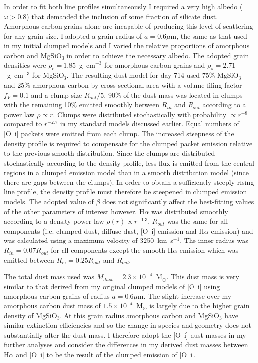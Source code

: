 In order to fit both line profiles simultaneously I required a very high albedo ($\omega > 0.8$) that demanded the inclusion of some fraction of silicate dust. Amorphous carbon grains alone are incapable of producing this level of scattering for any grain size.  I adopted a grain radius of $a=0.6\mu$m, the same as that used in my initial clumped models and I varied the relative proportions of amorphous carbon and MgSiO$_3$ in order to achieve the necessary albedo.  The adopted grain densities were $\rho_c=1.85$~g~cm$^{-3}$ for amorphous carbon grains and $\rho_s = 2.71$~g~cm$^{-3}$ for MgSiO$_3$.  The resulting dust model for day 714 used 75\% MgSiO$_3$ and 25\% amorphous carbon by cross-sectional area with a volume filing factor $f_V=0.1$ and a clump size $R_{out}/5$.  90\% of the dust mass was located in clumps with the remaining 10\% emitted smoothly between $R_{in}$ and $R_{out}$ according to a power law $\rho \propto r$. Clumps were distributed stochastically with probability $\propto r^{-8}$ compared to $r^{-2.7}$ in my standard models discussed earlier. Equal numbers of [O~{\sc i}] packets were emitted from each clump. The increased steepness of the density profile is required to compensate for the clumped packet emission relative to the previous smooth distribution.  Since the clumps are distributed stochastically according to the density profile, less flux is emitted from the central regions in a clumped emission model than in a smooth distribution model (since there are gaps between the clumps).  In order to obtain a sufficiently steeply rising line profile, the density profile must therefore be steepened in clumped emission models. The adopted value of $\beta$ does not significantly affect the best-fitting values of the other parameters of interest however.  H$\alpha$ was distributed smoothly according to a density power law $\rho(r) \propto r^{-1.3}$.  $R_{out}$ was the same for all components (i.e. clumped dust, diffuse dust, [O~{\sc i}] emission and H$\alpha$ emission) and was calculated using a maximum velocity of 3250~km~s$^{-1}$.  The inner radius was $R_{in} = 0.07 R_{out}$ for all components except the smooth H$\alpha$ emission which was emitted between $R_{in}=0.25R_{out}$ and $R_{out}$.  

The total dust mass used was $M_{dust}=2.3 \times 10^{-4}$~M$_{\odot}$.  This dust mass is very similar to that derived from my original clumped models of [O~{\sc i}] using amorphous carbon grains of radius $a=0.6\mu$m.  The slight increase over my amorphous carbon dust mass of $1.5 \times 10^{-4}$~M$_{\odot}$ is largely due to the higher grain density of MgSiO$_3$.  At this grain radius amorphous carbon and MgSiO$_3$ have similar extinction efficiencies and so the change in species and geometry does not substantially alter the dust mass. I therefore adopt the [O~{\sc i}] dust masses in my further analyses and consider the differences in my derived dust masses between H$\alpha$ and [O~{\sc i}] to be the result of the clumped emission of [O~{\sc i}].


